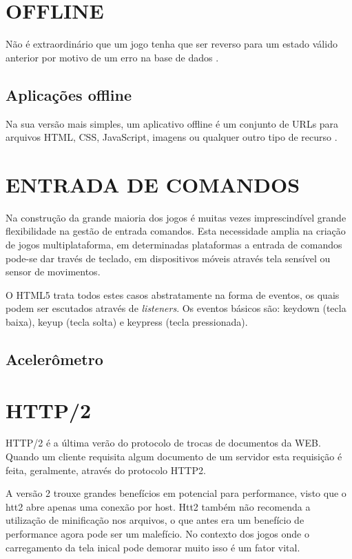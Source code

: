 \section{OFFLINE}

Não é extraordinário que um jogo tenha que ser reverso para um estado
válido anterior por motivo de um erro na base de dados \autocite[pp.
5]{browserGamesTechnologyAndFuture}.

\subsection{Aplicações offline}
Na sua versão mais simples, um aplicativo offline é um conjunto de
URLs para arquivos HTML, CSS, JavaScript, imagens ou qualquer outro tipo
de recurso \autocite{diveIntohtml}.

\section{ENTRADA DE COMANDOS}
Na construção da grande maioria dos jogos é muitas vezes
imprescindível grande flexibilidade na gestão de entrada comandos.
Esta necessidade amplia na criação de jogos multiplataforma, em
determinadas plataformas a entrada de comandos pode-se dar través de
teclado, em dispositivos móveis através tela sensível ou sensor de
movimentos.

O HTML5 trata todos estes casos abstratamente na forma de eventos, os
quais podem ser escutados através de \textit{listeners}. Os eventos
básicos são: keydown (tecla baixa), keyup (tecla solta) e keypress
(tecla pressionada).

\subsection{Acelerômetro}

\section{HTTP/2}

HTTP/2 é a última verão do protocolo de trocas de documentos da WEB. Quando um cliente requisita algum 
documento de um servidor esta requisição é feita, geralmente, através do protocolo HTTP2.

A versão 2 trouxe grandes benefícios em potencial para performance, visto que o htt2 abre apenas
uma conexão por host. 
Htt2 também não recomenda a utilização de minificação nos arquivos, o que antes era um benefício 
de performance agora pode ser um malefício. No contexto dos jogos onde o carregamento da tela inical 
pode demorar muito isso é um fator vital.


